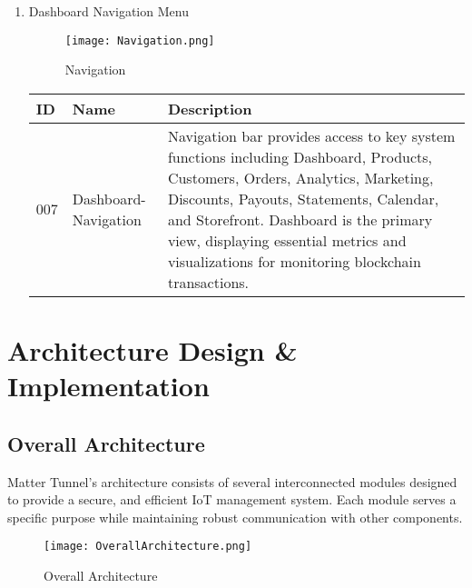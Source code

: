 \documentclass[conference]{IEEEtran}
\begin{document}
\begin{enumerate}[itemsep=2ex, parsep=1ex]
	\item Dashboard Navigation Menu

    \begin{figure}[h!]
        \centering
        \texttt{[image: Navigation.png]}
        \caption{Navigation}
        \label{fig:enter-label}
    \end{figure}
	      \begin{table}[h!]
	      	\def\arraystretch{1.24} \small
	      	\begin{tabular}{|p{1.2cm}|p{2.5cm}|p{4.0cm}|}
	      		\hline
	      		ID  & Name                 & Description                                                                                                                                                                                                                                                                                                     \\
	      		\hline
	      		007 & Dashboard-Navigation & Navigation bar provides access to key system functions including Dashboard, Products, Customers, Orders, Analytics, Marketing, Discounts, Payouts, Statements, Calendar, and Storefront. Dashboard is the primary view, displaying essential metrics and visualizations for monitoring blockchain transactions. \\
	      		\hline
	      	\end{tabular}
	      \end{table}
\end{enumerate}

\clearpage

\section{Architecture Design \& Implementation}
\subsection{Overall Architecture}

Matter Tunnel's architecture consists of several interconnected modules designed to provide a secure, and efficient IoT management system. Each module serves a specific purpose while maintaining robust communication with other components.

\begin{figure} [h!]
	\centering
	\texttt{[image: OverallArchitecture.png]}
	\caption{Overall Architecture}
	\label{fig:Overall Architecture}
\end{figure}
\end{document}
